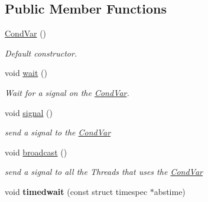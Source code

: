 \subsection*{Public Member Functions}
\begin{DoxyCompactItemize}
\item 
\hypertarget{classmognetwork_1_1_cond_var_ab7f3756ed998d61f8c4eec3d1f3a984b}{\hyperlink{classmognetwork_1_1_cond_var_ab7f3756ed998d61f8c4eec3d1f3a984b}{Cond\-Var} ()}\label{classmognetwork_1_1_cond_var_ab7f3756ed998d61f8c4eec3d1f3a984b}

\begin{DoxyCompactList}\small\item\em Default constructor. \end{DoxyCompactList}\item 
\hypertarget{classmognetwork_1_1_cond_var_afaee9fd061be682985bdc15d45e11816}{void \hyperlink{classmognetwork_1_1_cond_var_afaee9fd061be682985bdc15d45e11816}{wait} ()}\label{classmognetwork_1_1_cond_var_afaee9fd061be682985bdc15d45e11816}

\begin{DoxyCompactList}\small\item\em Wait for a signal on the \hyperlink{classmognetwork_1_1_cond_var}{Cond\-Var}. \end{DoxyCompactList}\item 
\hypertarget{classmognetwork_1_1_cond_var_aeb5e8e751376a09f36c115e342778d3f}{void \hyperlink{classmognetwork_1_1_cond_var_aeb5e8e751376a09f36c115e342778d3f}{signal} ()}\label{classmognetwork_1_1_cond_var_aeb5e8e751376a09f36c115e342778d3f}

\begin{DoxyCompactList}\small\item\em send a signal to the \hyperlink{classmognetwork_1_1_cond_var}{Cond\-Var} \end{DoxyCompactList}\item 
\hypertarget{classmognetwork_1_1_cond_var_ae407b095e176f8c360d1f03ceaac1ad7}{void \hyperlink{classmognetwork_1_1_cond_var_ae407b095e176f8c360d1f03ceaac1ad7}{broadcast} ()}\label{classmognetwork_1_1_cond_var_ae407b095e176f8c360d1f03ceaac1ad7}

\begin{DoxyCompactList}\small\item\em send a signal to all the Threads that uses the \hyperlink{classmognetwork_1_1_cond_var}{Cond\-Var} \end{DoxyCompactList}\item 
\hypertarget{classmognetwork_1_1_cond_var_a75efe016cf3ea093555f302bd980ad34}{void {\bfseries timedwait} (const struct timespec $\ast$abstime)}\label{classmognetwork_1_1_cond_var_a75efe016cf3ea093555f302bd980ad34}

\end{DoxyCompactItemize}
